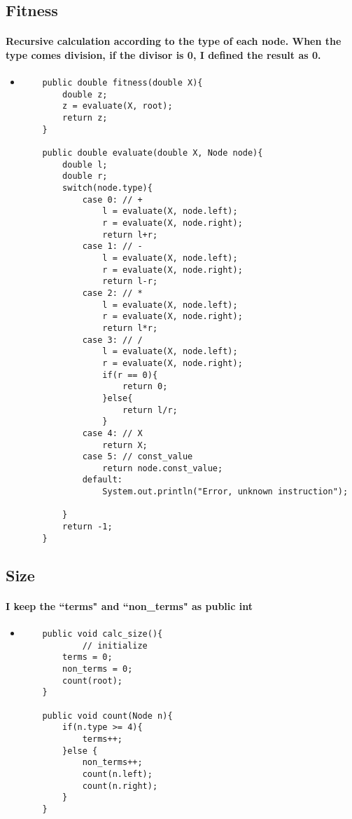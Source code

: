 \documentclass[12pt]{article}
\begin{document}
	\subsection{Fitness}
	\paragraph{Recursive calculation according to the type of each node. When the type comes division, if the divisor is 0, I defined the result as 0.}
	\begin{itemize}
	\item 
	\begin{lstlisting}
    public double fitness(double X){
        double z;
        z = evaluate(X, root);
        return z;
    }
    
    public double evaluate(double X, Node node){
        double l;
        double r;
        switch(node.type){
            case 0: // +
                l = evaluate(X, node.left);
                r = evaluate(X, node.right);
                return l+r;
            case 1: // -
                l = evaluate(X, node.left);
                r = evaluate(X, node.right);
                return l-r;
            case 2: // *
                l = evaluate(X, node.left);
                r = evaluate(X, node.right);
                return l*r;
            case 3: // /
                l = evaluate(X, node.left);
                r = evaluate(X, node.right);
                if(r == 0){
                    return 0;
                }else{
                    return l/r;
                }
            case 4: // X
                return X;
            case 5: // const_value
                return node.const_value;
            default:
                System.out.println("Error, unknown instruction");
                
        }
        return -1;
    }
	\end{lstlisting}
	\end{itemize}
	
	\subsection{Size}
	\paragraph{I keep the ``terms" and ``non\_terms" as public int}
	\begin{itemize}
	\item 
	\begin{lstlisting}
    public void calc_size(){
            // initialize
        terms = 0;
        non_terms = 0;              
        count(root);
    }
    
    public void count(Node n){
        if(n.type >= 4){
            terms++;
        }else {
            non_terms++;
            count(n.left);
            count(n.right);
        }
    }
	\end{lstlisting}
	\end{itemize}
	
\end{document}
